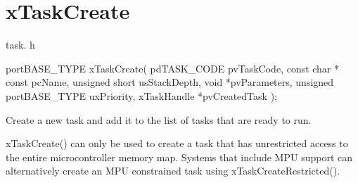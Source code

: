 \hypertarget{group__x_task_create}{\section{x\-Task\-Create}
\label{group__x_task_create}
}
task. h 
\begin{DoxyPre}
 portBASE\_TYPE xTaskCreate(
                                                          pdTASK\_CODE pvTaskCode,
                                                          const char * const pcName,
                                                          unsigned short usStackDepth,
                                                          void *pvParameters,
                                                          unsigned portBASE\_TYPE uxPriority,
                                                          xTaskHandle *pvCreatedTask
                                                  );\end{DoxyPre}


Create a new task and add it to the list of tasks that are ready to run.

x\-Task\-Create() can only be used to create a task that has unrestricted access to the entire microcontroller memory map. Systems that include M\-P\-U support can alternatively create an M\-P\-U constrained task using x\-Task\-Create\-Restricted().


